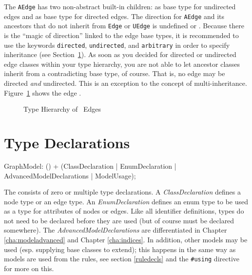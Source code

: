The \texttt{AEdge} has two non-abstract built-in children: \texttt{} as base type for undirected edges and \texttt{} as base type for directed edges.
The direction for \texttt{AEdge} and its ancestors that do not inherit from \texttt{Edge} or \texttt{UEdge} is undefined or .
Because there is the ``magic of direction'' linked to the edge base types, it is recommended to use the keywords \texttt{directed}, \texttt{undirected}, and \texttt{arbitrary} in order to specify inheritance (see Section~\ref{typedecl}).
As soon as you decided for directed or undirected edge classes within your type hierarchy, you are not able to let ancestor classes inherit from a contradicting base type, of course.
That is, no edge may be directed \emph{and} undirected.
This is an exception to the concept of multi-inheritance.
Figure~\ref{fig:basetypes} shows the edge .
\begin{figure}[htbp]
	\centering
	
	\caption{Type Hierarchy of \GrG\ Edges}
	\label{fig:basetypes}
\end{figure}


\section{Type Declarations}
\label{typedecl}

\begin{rail}
  GraphModel: () + (ClassDeclaration
  									 | EnumDeclaration
  									 | AdvancedModelDeclarations
  									 | ModelUsage);
\end{rail}
The  consists of zero or multiple type declarations.
A \emph{ClassDeclaration} defines a node type or an edge type.
An \emph{EnumDeclaration} defines an enum type to be used as a type for attributes of nodes or edges.
Like all identifier definitions, types do not need to be declared before they are used (but of course must be declared somewhere).
The \emph{AdvancedModelDeclarations} are differentiated in Chapter \ref{cha:modeladvanced} and Chapter \ref{cha:indices}.
In addition, other models may be used (esp. supplying base classes to extend); this happens in the same way as models are used from the rules, see section \ref{ruledecls} and the \verb/#using/ directive for more on this.


